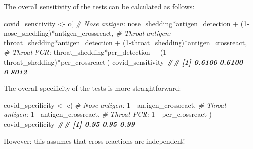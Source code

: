 \documentclass[
  ignorenonframetext,
  aspectratio=169,
]{beamer}
\newenvironment{Shaded}{\begin{snugshade}}{\end{snugshade}}
\newcommand{\CommentTok}[1]{\textcolor[rgb]{0.56,0.35,0.01}{\textit{#1}}}
\newcommand{\DecValTok}[1]{\textcolor[rgb]{0.00,0.00,0.81}{#1}}
\newcommand{\DocumentationTok}[1]{\textcolor[rgb]{0.56,0.35,0.01}{\textbf{\textit{#1}}}}
\newcommand{\FunctionTok}[1]{\textcolor[rgb]{0.00,0.00,0.00}{#1}}
\newcommand{\NormalTok}[1]{#1}
\newcommand{\OtherTok}[1]{\textcolor[rgb]{0.56,0.35,0.01}{#1}}
\newcommand{\SpecialCharTok}[1]{\textcolor[rgb]{0.00,0.00,0.00}{#1}}
\begin{document}
\begin{frame}[fragile]
The overall sensitivity of the tests can be calculated as follows:

\scriptsize

\begin{Shaded}
\begin{Highlighting}[]
\NormalTok{covid\_sensitivity }\OtherTok{\textless{}{-}} \FunctionTok{c}\NormalTok{(}
  \CommentTok{\# Nose antigen:}
\NormalTok{  nose\_shedding}\SpecialCharTok{*}\NormalTok{antigen\_detection }\SpecialCharTok{+}\NormalTok{ (}\DecValTok{1}\SpecialCharTok{{-}}\NormalTok{nose\_shedding)}\SpecialCharTok{*}\NormalTok{antigen\_crossreact,}
  \CommentTok{\# Throat antigen:}
\NormalTok{  throat\_shedding}\SpecialCharTok{*}\NormalTok{antigen\_detection }\SpecialCharTok{+}\NormalTok{ (}\DecValTok{1}\SpecialCharTok{{-}}\NormalTok{throat\_shedding)}\SpecialCharTok{*}\NormalTok{antigen\_crossreact,}
  \CommentTok{\# Throat PCR:}
\NormalTok{  throat\_shedding}\SpecialCharTok{*}\NormalTok{pcr\_detection }\SpecialCharTok{+}\NormalTok{ (}\DecValTok{1}\SpecialCharTok{{-}}\NormalTok{throat\_shedding)}\SpecialCharTok{*}\NormalTok{pcr\_crossreact}
\NormalTok{)}
\NormalTok{covid\_sensitivity}
\DocumentationTok{\#\# [1] 0.6100 0.6100 0.8012}
\end{Highlighting}
\end{Shaded}

\normalsize
\end{frame}

\begin{frame}[fragile]
The overall specificity of the tests is more straightforward:

\scriptsize

\begin{Shaded}
\begin{Highlighting}[]
\NormalTok{covid\_specificity }\OtherTok{\textless{}{-}} \FunctionTok{c}\NormalTok{(}
  \CommentTok{\# Nose antigen:}
  \DecValTok{1} \SpecialCharTok{{-}}\NormalTok{ antigen\_crossreact,}
  \CommentTok{\# Throat antigen:}
  \DecValTok{1} \SpecialCharTok{{-}}\NormalTok{ antigen\_crossreact,}
  \CommentTok{\# Throat PCR:}
  \DecValTok{1} \SpecialCharTok{{-}}\NormalTok{ pcr\_crossreact}
\NormalTok{)}
\NormalTok{covid\_specificity}
\DocumentationTok{\#\# [1] 0.95 0.95 0.99}
\end{Highlighting}
\end{Shaded}

\normalsize

\pause

However: this assumes that cross-reactions are independent!
\end{frame}
\end{document}
